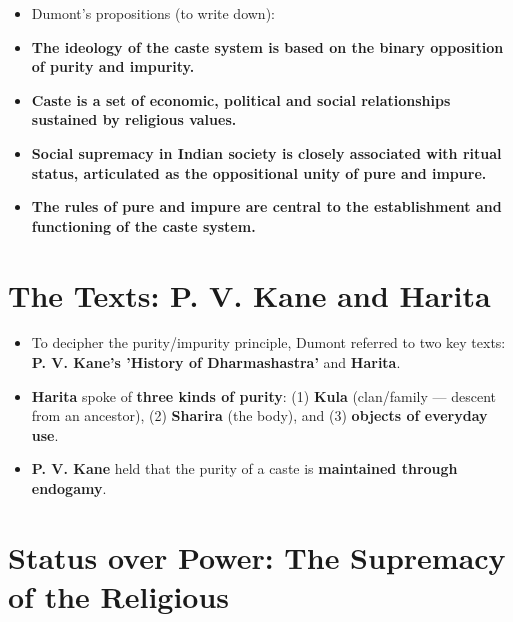 \begin{KeyConcept}
\begin{itemize}
\item Dumont's propositions (to write down):
\item \textbf{The ideology of the caste system is based on the binary opposition of purity and impurity.}
\item \textbf{Caste is a set of economic, political and social relationships sustained by religious values.}
\item \textbf{Social supremacy in Indian society is closely associated with ritual status, articulated as the oppositional unity of pure and impure.}
\item \textbf{The rules of pure and impure are central to the establishment and functioning of the caste system.}
\end{itemize}
\end{KeyConcept}

\section{The Texts: P. V. Kane and Harita}

\begin{KeyConcept}
\begin{itemize}
\item To decipher the purity/impurity principle, Dumont referred to two key texts: \textbf{P. V. Kane's 'History of Dharmashastra'} and \textbf{Harita}.
\item \textbf{Harita} spoke of \textbf{three kinds of purity}: (1) \textbf{Kula} (clan/family --- descent from an ancestor), (2) \textbf{Sharira} (the body), and (3) \textbf{objects of everyday use}.
\item \textbf{P. V. Kane} held that the purity of a caste is \textbf{maintained through endogamy}.
\end{itemize}
\end{KeyConcept}

\section{Status over Power: The Supremacy of the Religious}

